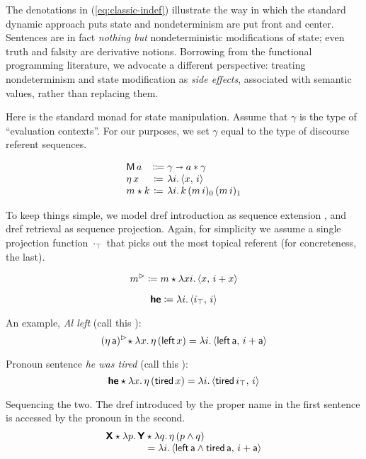   The denotations in (\ref{eq:classic-indef}) illustrate the way in which the standard dynamic approach puts state and nondeterminism are put front and center. Sentences are in fact \emph{nothing but} nondeterministic modifications of state; even truth and falsity are derivative notions. Borrowing from the functional programming literature, we advocate a different perspective: treating nondeterminism and state modification as \emph{side effects}, associated with semantic values, rather than replacing them. 
	
  Here is the standard monad for state manipulation. Assume that $\gamma$ is the type of ``evaluation contexts''. For our purposes, we set $\gamma$ equal to the type of discourse referent sequences.%
	\begin{defi}\label{state}
		\[\begin{array}[t]
			{@{}l@{}c@{}l@{}}
			\textsf{M}\,a &{}\Coloneqq{} &\gamma \ra a \ast \gamma	%
			\\
			\eta\,x &{}\ceq{} &\lambda i.\,\ab{x,\,i}
			\\
			m \star k &{}\ceq{} &\lambda i.\,k\,(m\,i)_0\,(m\,i)_1%
		\end{array}\]
	\end{defi}
	
  To keep things simple, we model dref introduction as sequence extension \citep[cf.][]{Groote:2006, Unger:2012, Charlow:diss}, and dref retrieval as sequence projection. Again, for simplicity we assume a single projection function $\cdot_\top$ that picks out the most topical referent (for concreteness, the last).
	\begin{defi}
		\[m^\rhd \coloneqq m \star \lambda xi.\,\langle x,\,i + x \rangle\]
	\end{defi}
	\begin{defi}
		\[\textbf{\textsf{he}} \coloneqq \lambda i.\,\langle i_\top,\,i \rangle\]
	\end{defi}
	
	An example, \emph{Al left} (call this ):
	\[(\eta\,\textsf{a})^\rhd\! \star \lambda x.\,\eta\,(\textsf{left}\,x) = \lambda i.\,\langle \textsf{left}\,\textsf{a},\,i+\textsf{a} \rangle\]%
	
	Pronoun sentence \emph{he was tired} (call this ):
	\[\textbf{\textsf{he}} \star \lambda x.\,\eta\,(\textsf{tired}\,x) = \lambda i.\,\langle \textsf{tired}\,i_\top,\,i \rangle\]%
	
	Sequencing the two. The dref introduced by the proper name in the first sentence is accessed by the pronoun in the second. %
	\[\begin{array}{r@{}l}
		\bsf{X} \star \lambda p.\,\bsf{Y}&{}\star \lambda q.\,\eta\,(p \wedge q) %
		\\
		&{}= \lambda i.\,\ab{\textsf{left}\,\textsf{a} \wedge \textsf{tired}\,\textsf{a},\,i+\textsf{a}}%
	\end{array}\]
	
